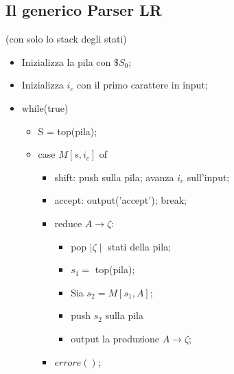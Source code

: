\documentclass[a4paper,12pt]{article}
\begin{document}
{\subsection{Il generico Parser LR}
(con solo lo stack degli stati) 
\begin{itemize}
  \item Inizializza la pila con $\mathdollar S_0$; %
  \item Inizializza $i_c$ con il primo carattere in input;
  \item while(true)
  \begin{itemize}
    \item S = top(pila); %
    \item case $M[s, i_c]$ of
      \begin{itemize}
        \item shift: {push sulla pila; avanza $i_c$ sull'input;}
        \item accept: {output('accept'); break;}
        \item reduce $A \to \zeta$: 
          \begin{itemize}
            \item pop $\mid \zeta \mid$ stati della pila;
            \item $s_1 = $ top(pila); %
            \item Sia $s_2 = M[s_1, A]$; %
            \item push $s_2$ sulla pila
            \item output la produzione $A \to \zeta$;
          \end{itemize}
        \item $errore()$;
      \end{itemize}
  \end{itemize}
\end{itemize}
\vspace{1em}
}
\end{document}
